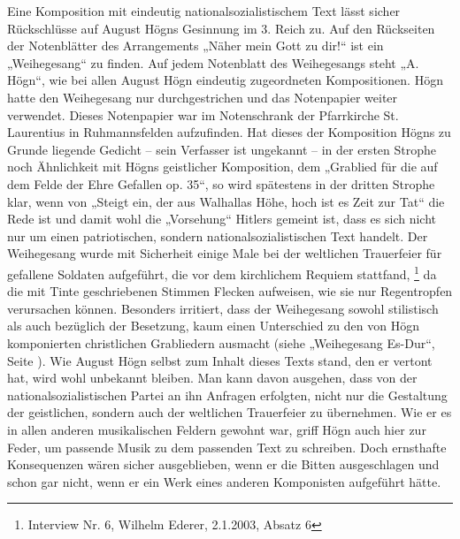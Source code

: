 Eine Komposition mit eindeutig nationalsozialistischem Text lässt sicher
Rückschlüsse auf August Högns Gesinnung im 3. Reich zu. Auf den
Rückseiten der Notenblätter des Arrangements „Näher mein Gott zu dir!“
ist ein „Weihegesang“ zu finden. Auf jedem Notenblatt des Weihegesangs
steht „A. Högn“, wie bei allen August Högn eindeutig zugeordneten
Kompositionen. Högn hatte den Weihegesang nur durchgestrichen und das
Notenpapier weiter verwendet. Dieses Notenpapier war im Notenschrank
der Pfarrkirche St. Laurentius in Ruhmannsfelden aufzufinden. Hat
dieses der Komposition Högns zu Grunde liegende Gedicht – sein
Verfasser ist ungekannt – in der ersten Strophe noch Ähnlichkeit mit
Högns geistlicher Komposition, dem „Grablied für die auf dem Felde der
Ehre Gefallen op. 35“, so wird spätestens in der dritten Strophe klar,
wenn von „Steigt ein, der aus Walhallas Höhe, hoch ist es Zeit zur Tat“
die Rede ist und damit wohl die „Vorsehung“ Hitlers gemeint ist, dass
es sich nicht nur um einen patriotischen, sondern
nationalsozialistischen Text handelt. Der Weihegesang wurde mit
Sicherheit einige Male bei der weltlichen Trauerfeier für gefallene
Soldaten aufgeführt, die vor dem kirchlichem Requiem
stattfand, \footnote{Interview Nr. 6, Wilhelm Ederer, 2.1.2003, Absatz
6} da die mit Tinte geschriebenen Stimmen Flecken aufweisen, wie sie
nur Regentropfen verursachen können. Besonders irritiert, dass der
Weihegesang sowohl stilistisch als auch bezüglich der Besetzung, kaum
einen Unterschied zu den von Högn komponierten christlichen Grabliedern
ausmacht (siehe  „Weihegesang Es-Dur“, Seite
). Wie August Högn selbst zum Inhalt dieses
Texts stand, den er vertont hat, wird wohl unbekannt bleiben. Man kann
davon ausgehen, dass von der nationalsozialistischen Partei an ihn
Anfragen erfolgten, nicht nur die Gestaltung der geistlichen, sondern
auch der weltlichen Trauerfeier zu übernehmen. Wie er es in allen
anderen musikalischen Feldern gewohnt war, griff Högn auch hier zur
Feder, um passende Musik zu dem passenden Text zu schreiben. Doch
ernsthafte Konsequenzen wären sicher ausgeblieben, wenn er die Bitten
ausgeschlagen und schon gar nicht, wenn er ein Werk eines anderen
Komponisten aufgeführt hätte.

